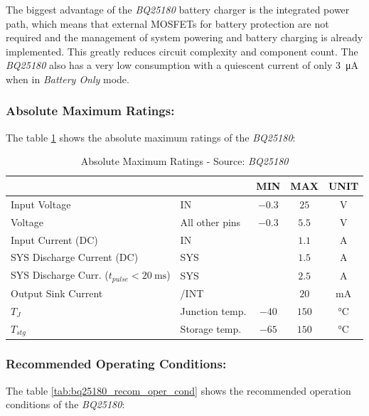 \documentclass[report.tex]{subfiles}
\begin{document}
The biggest advantage of the \textit{BQ25180} battery charger is the integrated power path, which means that external MOSFETs for battery protection are not required and the management of system powering and battery charging is already implemented. This greatly reduces circuit complexity and component count. The \textit{BQ25180} also has a very low consumption with a quiescent current of only \SI{3}{\micro\ampere} when in \textit{Battery Only} mode.

\subsubsection{Absolute Maximum Ratings:}
The table \ref{tab:bq25180_absolute_max_rating} shows the absolute maximum ratings of the \textit{BQ25180}:

\begin{table}[H]
\centering
\begin{tabularx}{\textwidth}{|X|l|c|c|c|}
\hline
\, & \; & \textbf{MIN} & \textbf{MAX} & \textbf{UNIT} \\\hline
Input Voltage & IN & $-0.3$ & $25$ & $\si{\volt}$ \\\hline
Voltage & All other pins & $-0.3$ & $5.5$ & $\si{\volt}$ \\\hline
Input Current (DC) & IN & & $1.1$ & $\si{\ampere}$ \\\hline
SYS Discharge Current (DC) & SYS & & $1.5$ & $\si{\ampere}$ \\\hline
SYS Discharge Curr. ($t_{pulse}<\SI{20}{\milli\second}$) & SYS & & $2.5$ & $\si{\ampere}$ \\\hline
Output Sink Current & /INT & & $20$ & $\si{\milli\ampere}$ \\\hline
$T_J$ & Junction temp. & $-40$ & $150$ & $\si{\celsius}$ \\\hline
$T_{stg}$ & Storage temp. & $-65$ & $150$ & $\si{\celsius}$ \\\hline
\end{tabularx}
\caption{Absolute Maximum Ratings - Source: \textit{BQ25180}\cite{bq25180DS}}
\label{tab:bq25180_absolute_max_rating}
\end{table}

\subsubsection{Recommended Operating Conditions:}
The table \ref{tab:bq25180_recom_oper_cond} shows the recommended operation conditions of the \textit{BQ25180}:
\end{document}
